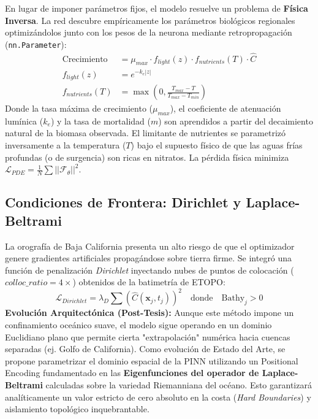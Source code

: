 \documentclass[11pt,a4paper]{article}
\begin{document}
En lugar de imponer parámetros fijos, el modelo resuelve un problema de \textbf{Física Inversa}. La red descubre empíricamente los parámetros biológicos regionales optimizándolos junto con los pesos de la neurona mediante retropropagación (\texttt{nn.Parameter}):
\begin{equation}
\begin{split}
\text{Crecimiento} &= \mu_{max} \cdot f_{light}(z) \cdot f_{nutrients}(T) \cdot \hat{C} \\[0.2cm]
f_{light}(z) &= e^{-k_e |z|} \\[0.2cm]
f_{nutrients}(T) &= \max \left( 0, \frac{T_{max} - T}{T_{max} - T_{min}} \right)
\end{split}
\end{equation}
Donde la tasa máxima de crecimiento ($\mu_{max}$), el coeficiente de atenuación lumínica ($k_e$) y la tasa de mortalidad ($m$) son aprendidos a partir del decaimiento natural de la biomasa observada. El limitante de nutrientes se parametrizó inversamente a la temperatura ($T$) bajo el supuesto físico de que las aguas frías profundas (o de surgencia) son ricas en nitratos. La pérdida física minimiza $\mathcal{L}_{PDE} = \frac{1}{N} \sum ||\mathcal{F}_\theta||^2$.

\subsection{Condiciones de Frontera: Dirichlet y Laplace-Beltrami}
La orografía de Baja California presenta un alto riesgo de que el optimizador genere gradientes artificiales propagándose sobre tierra firme. Se integró una función de penalización \textit{Dirichlet} inyectando nubes de puntos de colocación ($colloc\_ratio = 4\times$) obtenidos de la batimetría de ETOPO:
\begin{equation}
\mathcal{L}_{Dirichlet} = \lambda_D \sum \left( \hat{C}(\mathbf{x}_j, t_j) \right)^2 \quad \text{donde} \quad \text{Bathy}_j > 0
\end{equation}
\textbf{Evolución Arquitectónica (Post-Tesis):} Aunque este método impone un confinamiento oceánico suave, el modelo sigue operando en un dominio Euclidiano plano que permite cierta "extrapolación" numérica hacia cuencas separadas (ej. Golfo de California). Como evolución de Estado del Arte, se propone parametrizar el dominio espacial de la PINN utilizando un Positional Encoding fundamentado en las \textbf{Eigenfunciones del operador de Laplace-Beltrami} calculadas sobre la variedad Riemanniana del océano. Esto garantizará analíticamente un valor estricto de cero absoluto en la costa (\textit{Hard Boundaries}) y aislamiento topológico inquebrantable.
\end{document}
